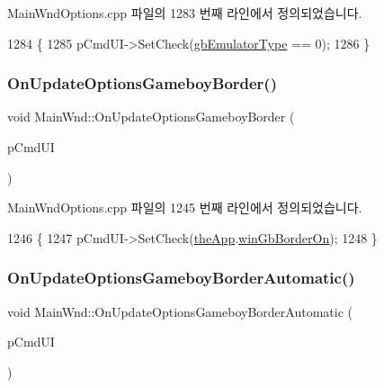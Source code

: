 Main\+Wnd\+Options.\+cpp 파일의 1283 번째 라인에서 정의되었습니다.


\begin{DoxyCode}
1284 \{
1285   pCmdUI->SetCheck(\mbox{\hyperlink{gb_globals_8cpp_aab449ed6ecf2bd502928a3d5aa5c54c4}{gbEmulatorType}} == 0);
1286 \}
\end{DoxyCode}
\mbox{\label{class_main_wnd_a29620d7ff13dcf0a51ba63a051e9b2d4}} 
\subsubsection{\texorpdfstring{On\+Update\+Options\+Gameboy\+Border()}{OnUpdateOptionsGameboyBorder()}}
{\footnotesize\ttfamily void Main\+Wnd\+::\+On\+Update\+Options\+Gameboy\+Border (\begin{DoxyParamCaption}\item[{C\+Cmd\+UI $\ast$}]{p\+Cmd\+UI }\end{DoxyParamCaption})\hspace{0.3cm}{\ttfamily [protected]}}



Main\+Wnd\+Options.\+cpp 파일의 1245 번째 라인에서 정의되었습니다.


\begin{DoxyCode}
1246 \{
1247   pCmdUI->SetCheck(\mbox{\hyperlink{_v_b_a_8cpp_a8095a9d06b37a7efe3723f3218ad8fb3}{theApp}}.\mbox{\hyperlink{class_v_b_a_afacb46f54fb546d8d97055dc535b074e}{winGbBorderOn}});
1248 \}
\end{DoxyCode}
\mbox{\label{class_main_wnd_a7181010c8912d36e6921ef2bfd1adf59}} 
\subsubsection{\texorpdfstring{On\+Update\+Options\+Gameboy\+Border\+Automatic()}{OnUpdateOptionsGameboyBorderAutomatic()}}
{\footnotesize\ttfamily void Main\+Wnd\+::\+On\+Update\+Options\+Gameboy\+Border\+Automatic (\begin{DoxyParamCaption}\item[{C\+Cmd\+UI $\ast$}]{p\+Cmd\+UI }\end{DoxyParamCaption})\hspace{0.3cm}{\ttfamily [protected]}}



